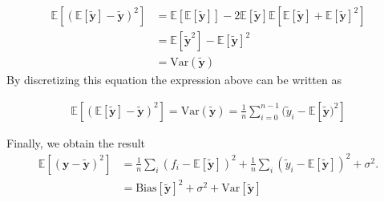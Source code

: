 \begin{align*}
    \mathbb{E}[(\mathbb{E}[\mathbf{\tilde{y}}]-\mathbf{\tilde{y}})^2] &=\mathbb{E}[\mathbb{E}[\mathbf{\tilde{y}}]]-2\mathbb{E}[\mathbf{\tilde{y}}]\mathbb{E}[\mathbb{E}[\mathbf{\tilde{y}}]+\mathbb{E}[\mathbf{\tilde{y}}]^2]\\
    &=\mathbb{E}[\mathbf{\tilde{y}}^2]-\mathbb{E}[\mathbf{\tilde{y}}]^2\\
    &=\mathrm{Var}(\mathbf{\tilde{y}})
\end{align*} By discretizing this equation the expression above can be written as

\begin{align*}
    \mathbb{E}[(\mathbb{E}[\mathbf{\tilde{y}}]-\mathbf{\tilde{y}})^2]=\mathrm{Var}(\mathbf{\tilde{y}})=\frac{1}{n}\sum_{i=0}^{n-1}(\tilde{y}_i-\mathbb{E}[\mathbf{\tilde{y}})^2]
\end{align*}

Finally, we obtain the result
\begin{align}
    \mathbb{E}\left[(\mathbf{y}-\mathbf{\tilde{y}})^2\right]&=\frac{1}{n}\sum_i(f_i-\mathbb{E}\left[\mathbf{\tilde{y}}\right])^2+\frac{1}{n}\sum_i(\tilde{y}_i-\mathbb{E}\left[\mathbf{\tilde{y}}\right])^2+\sigma^2.\\
    &=\mathrm{Bias}[\mathbf{\tilde{y}}]^2+\sigma^2+\mathrm{Var}[\mathbf{\tilde{y}}]
\end{align}


